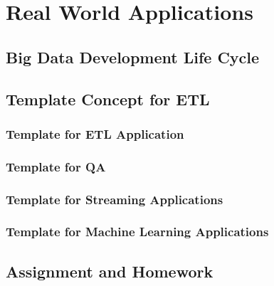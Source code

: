 \section{Real World Applications}
\subsection{Big Data Development Life Cycle}
\subsection{Template Concept for ETL}
\subsubsection{Template for ETL Application}
\subsubsection{Template for QA}
\subsubsection{Template for Streaming Applications}
\subsubsection{Template for Machine Learning Applications}
\subsection{Assignment and Homework}